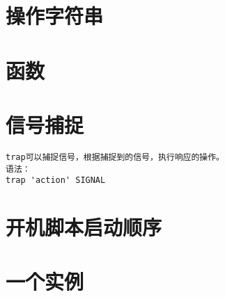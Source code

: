 \section{操作字符串}

\section{函数}

\section{信号捕捉}

\begin{verbatim}
trap可以捕捉信号，根据捕捉到的信号，执行响应的操作。
语法：
trap 'action' SIGNAL
\end{verbatim}

\section{开机脚本启动顺序}

\section{一个实例}


